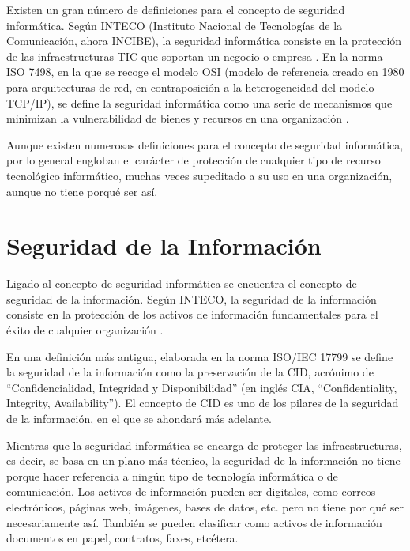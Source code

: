 Existen un gran número de definiciones para el concepto de seguridad informática. Según INTECO (Instituto Nacional de Tecnologías de la Comunicación, ahora INCIBE), la seguridad informática consiste en la protección de las infraestructuras TIC que soportan un negocio o empresa \cite{inteco-defs}. En la norma ISO 7498, en la que se recoge el modelo OSI (modelo de referencia creado en 1980 para arquitecturas de red, en contraposición a la heterogeneidad del modelo TCP/IP), se define la seguridad informática como una serie de mecanismos que minimizan la vulnerabilidad de bienes y recursos en una organización \cite{iso-7498}.

Aunque existen numerosas definiciones para el concepto de seguridad informática, por lo general engloban el carácter de protección de cualquier tipo de recurso tecnológico informático, muchas veces supeditado a su uso en una organización, aunque no tiene porqué ser así.


\section{Seguridad de la Información}

Ligado al concepto de seguridad informática se encuentra el concepto de seguridad de la información. Según INTECO, la seguridad de la información consiste en la protección de los activos de información fundamentales para el éxito de cualquier organización \cite{inteco-defs}.

En una definición más antigua, elaborada en la norma ISO/IEC 17799 \cite{iso-17799} se define la seguridad de la información como la preservación de la CID, acrónimo de “Confidencialidad, Integridad y Disponibilidad” (en inglés CIA, “Confidentiality, Integrity, Availability”). El concepto de CID es uno de los pilares de la seguridad de la información, en el que se ahondará más adelante.

Mientras que la seguridad informática se encarga de proteger las infraestructuras, es decir, se basa en un plano más técnico, la seguridad de la información no tiene porque hacer referencia a ningún tipo de tecnología informática o de comunicación. Los activos de información pueden ser digitales, como correos electrónicos, páginas web, imágenes, bases de datos, etc. pero no  tiene por qué ser necesariamente así. También se pueden clasificar como activos de información documentos en papel, contratos, faxes, etcétera.

